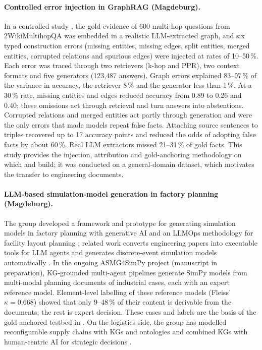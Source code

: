 \paragraph{Controlled error injection in GraphRAG (Magdeburg).}
In a controlled study \parencite{reider2026graph}, the gold evidence of 600 multi-hop questions from 2WikiMultihopQA \parencite{ho2020constructing} was embedded in a realistic \ac{LLM}-extracted graph, and six typed construction errors (missing entities, missing edges, split entities, merged entities, corrupted relations and spurious edges) were injected at rates of 10--50\,\%. Each error was traced through two retrievers (k-hop and \ac{PPR}), two context formats and five generators (123{,}487 answers). Graph errors explained 83--97\,\% of the variance in accuracy, the retriever 8\,\% and the generator less than 1\,\%. At a 30\,\% rate, missing entities and edges reduced accuracy from 0.89 to 0.26 and 0.40; these omissions act through retrieval and turn answers into abstentions. Corrupted relations and merged entities act partly through generation and were the only errors that made models repeat false facts. Attaching source sentences to triples recovered up to 17 accuracy points and reduced the odds of adopting false facts by about 60\,\%. Real \ac{LLM} extractors missed 21--31\,\% of gold facts. This study provides the injection, attribution and gold-anchoring methodology on which  and  build; it was conducted on a general-domain dataset, which motivates the transfer to engineering documents.

\paragraph{LLM-based simulation-model generation in factory planning (Magdeburg).}
The group developed a framework and prototype for generating simulation models in factory planning with generative AI \parencite{kute2025generative} and an LLMOps methodology for facility layout planning \parencite{ma2026llmops}; related work converts engineering papers into executable tools for \ac{LLM} agents \parencite{ma2026replicating} and generates discrete-event simulation models automatically \parencite{kute2026automatic}. In the ongoing ASMG4SimPy project (manuscript in preparation), \ac{KG}-grounded multi-agent pipelines generate SimPy models from multi-modal planning documents of industrial cases, each with an expert reference model. Element-level labelling of these reference models (Fleiss' $\kappa = 0.668$) showed that only 9--48\,\% of their content is derivable from the documents; the rest is expert decision. These cases and labels are the basis of the gold-anchored testbed in . On the logistics side, the group has modelled reconfigurable supply chains with \acp{KG} and ontologies \parencite{saidi2025modeling,saidi2025semantic} and combined \acp{KG} with human-centric AI for strategic decisions \parencite{rolf2022using}.

